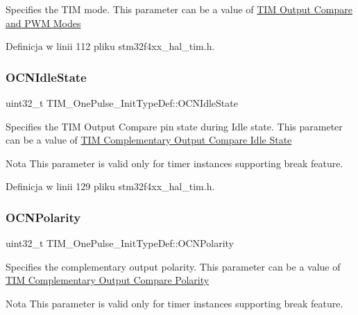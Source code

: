 Specifies the T\+IM mode. This parameter can be a value of \hyperlink{group___t_i_m___output___compare__and___p_w_m__modes}{T\+IM Output Compare and P\+WM Modes} 

Definicja w linii 112 pliku stm32f4xx\+\_\+hal\+\_\+tim.\+h.

\mbox{\label{struct_t_i_m___one_pulse___init_type_def_a37bc0a680d53458bf4c42ebb277b0c2c}} 
\subsubsection{\texorpdfstring{O\+C\+N\+Idle\+State}{OCNIdleState}}
{\footnotesize\ttfamily uint32\+\_\+t T\+I\+M\+\_\+\+One\+Pulse\+\_\+\+Init\+Type\+Def\+::\+O\+C\+N\+Idle\+State}

Specifies the T\+IM Output Compare pin state during Idle state. This parameter can be a value of \hyperlink{group___t_i_m___output___compare___n___idle___state}{T\+IM Complementary Output Compare Idle State} \begin{DoxyNote}{Nota}
This parameter is valid only for timer instances supporting break feature. 
\end{DoxyNote}


Definicja w linii 129 pliku stm32f4xx\+\_\+hal\+\_\+tim.\+h.

\mbox{\label{struct_t_i_m___one_pulse___init_type_def_a00deac6c3347b0482955d936351c6388}} 
\subsubsection{\texorpdfstring{O\+C\+N\+Polarity}{OCNPolarity}}
{\footnotesize\ttfamily uint32\+\_\+t T\+I\+M\+\_\+\+One\+Pulse\+\_\+\+Init\+Type\+Def\+::\+O\+C\+N\+Polarity}

Specifies the complementary output polarity. This parameter can be a value of \hyperlink{group___t_i_m___output___compare___n___polarity}{T\+IM Complementary Output Compare Polarity} \begin{DoxyNote}{Nota}
This parameter is valid only for timer instances supporting break feature. 
\end{DoxyNote}


